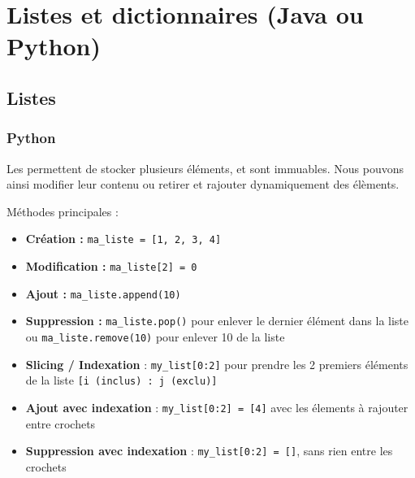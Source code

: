 \section{Listes et dictionnaires (Java ou Python)}

\subsection{Listes}

\subsubsection{Python}
Les  permettent de stocker plusieurs éléments, et sont immuables. Nous pouvons ainsi modifier leur contenu ou retirer et rajouter dynamiquement des élèments.

Méthodes principales :
\begin{itemize}
    \item \textbf{Création :} \lstinline{ma_liste = [1, 2, 3, 4]}
    \item \textbf{Modification :} \lstinline{ma_liste[2] = 0}
    \item \textbf{Ajout :} \lstinline{ma_liste.append(10)}
    \item \textbf{Suppression :} \lstinline{ma_liste.pop()} pour enlever le dernier élément dans la liste ou \lstinline{ma_liste.remove(10)} pour enlever 10 de la liste
    \item \textbf{Slicing / Indexation} : \lstinline{my_list[0:2]} pour prendre les 2 premiers éléments de la liste \lstinline{[i (inclus) : j (exclu)]}
    \item \textbf{Ajout avec indexation} : \lstinline{my_list[0:2] = [4]} avec les élements à rajouter entre crochets
    \item \textbf{Suppression avec indexation} : \lstinline{my_list[0:2] = []}, sans rien entre les crochets
\end{itemize}
\ \\

